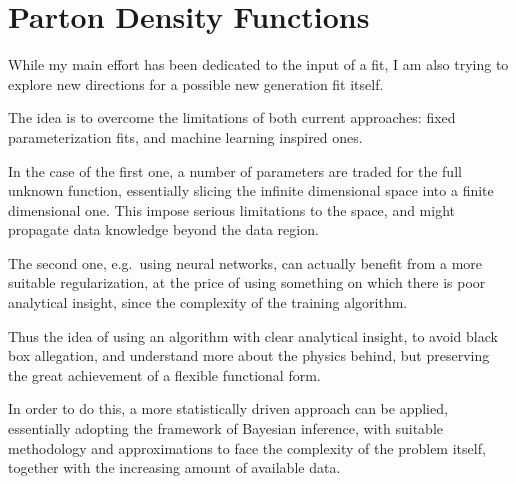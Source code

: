 \section{Parton Density Functions}

While my main effort has been dedicated to the input of a \pdf fit, I am also
trying to explore new directions for a possible new generation fit itself.

The idea is to overcome the limitations of both current approaches: fixed
parameterization fits, and machine learning inspired ones.

In the case of the first one, a number of parameters are traded for the full
unknown function, essentially slicing the infinite dimensional space into a
finite dimensional one.
This impose serious limitations to the space, and might propagate data
knowledge beyond the data region.

The second one, e.g.\ using neural networks, can actually benefit from a more
suitable regularization, at the price of using something on which there is poor
analytical insight, since the complexity of the training algorithm.
\newline

 Thus the idea of using an algorithm with clear analytical
insight, to avoid black box allegation, and understand more about the physics
behind, but preserving the great achievement of a flexible functional form.

In order to do this, a more statistically driven approach can be applied,
essentially adopting the framework of Bayesian inference, with suitable
methodology and approximations to face the complexity of the problem itself,
together with the increasing amount of available data.
